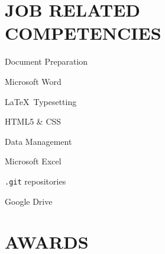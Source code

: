 \documentclass[margin]{res}
\begin{document}
\begin{resume}
\section{JOB RELATED COMPETENCIES} \vspace{0pt}
	\begin{multicols}{2}
		\parskip=0pt
		\begin{skill}{Document Preparation}
			\item Microsoft Word
			\item \LaTeX\ Typesetting
			\item HTML5 \& CSS
		\end{skill}
		\begin{skill}{Data Management}
			\item Microsoft Excel
			\item \texttt{.git} repositories
			\item Google Drive
		\end{skill}
	\end{multicols}

\section{AWARDS} \vspace{10pt}
	\begin{description}[noitemsep,topsep=0pt]
	\end{description}
 




 

\end{resume}
\end{document}
